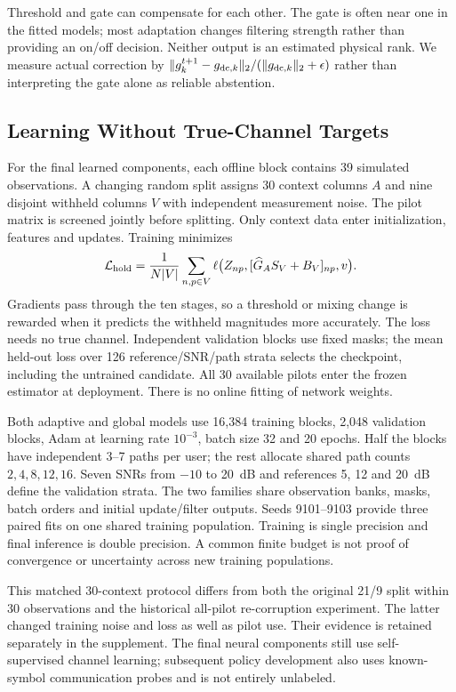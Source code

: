 \documentclass[10pt,journal,letterpaper]{IEEEtran}
\begin{document}
Threshold and gate can compensate for each other. The gate is often near one in the fitted models; most adaptation changes filtering strength rather than providing an on/off decision. Neither output is an estimated physical rank. We measure actual correction by $\|g_k^{t+1}-g_{{\rm dc},k}\|_2/(\|g_{{\rm dc},k}\|_2+\epsilon)$ rather than interpreting the gate alone as reliable abstention.

\subsection{Learning Without True-Channel Targets}
For the final learned components, each offline block contains 39 simulated observations. A changing random split assigns 30 context columns $A$ and nine disjoint withheld columns $V$ with independent measurement noise. The pilot matrix is screened jointly before splitting. Only context data enter initialization, features and updates. Training minimizes
\begin{equation}
 \mathcal L_{\rm hold}=\frac{1}{N|V|}\sum_{n,p\in V}
 \ell\big(Z_{np},[\widehat G_A S_V+B_V]_{np},v\big).
\end{equation}
Gradients pass through the ten stages, so a threshold or mixing change is rewarded when it predicts the withheld magnitudes more accurately. The loss needs no true channel. Independent validation blocks use fixed masks; the mean held-out loss over 126 reference/SNR/path strata selects the checkpoint, including the untrained candidate. All 30 available pilots enter the frozen estimator at deployment. There is no online fitting of network weights.

Both adaptive and global models use 16,384 training blocks, 2,048 validation blocks, Adam at learning rate $10^{-3}$, batch size 32 and 20 epochs. Half the blocks have independent 3--7 paths per user; the rest allocate shared path counts $2,4,8,12,16$. Seven SNRs from $-10$ to 20~dB and references 5, 12 and 20~dB define the validation strata. The two families share observation banks, masks, batch orders and initial update/filter outputs. Seeds 9101--9103 provide three paired fits on one shared training population. Training is single precision and final inference is double precision. A common finite budget is not proof of convergence or uncertainty across new training populations.

This matched 30-context protocol differs from both the original 21/9 split within 30 observations and the historical all-pilot re-corruption experiment. The latter changed training noise and loss as well as pilot use. Their evidence is retained separately in the supplement. The final neural components still use self-supervised channel learning; subsequent policy development also uses known-symbol communication probes and is not entirely unlabeled.
\end{document}
